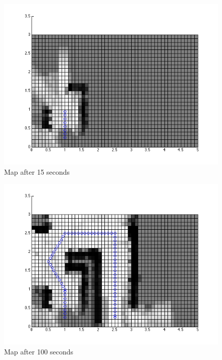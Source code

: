 \documentclass[12pt]{article}
\begin{document}
\begin{figure}[ht]
\hspace{0.5cm}
\centering
\includegraphics[scale=0.5]{Pictures/question3_15.png}
\caption{Map after 15 seconds}
\end{figure}

\begin{figure}[ht]
\hspace{0.5cm}
\centering
\includegraphics[scale=0.5]{Pictures/question3_100.png}
\caption{Map after 100 seconds}
\end{figure}
\end{document}
